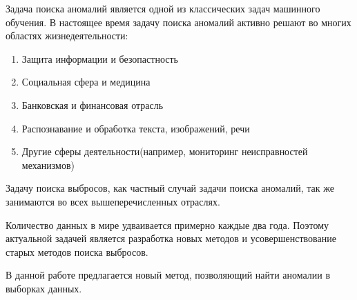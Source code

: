 \Introduction

Задача поиска аномалий является одной из классических задач машинного обучения. В настоящее время задачу поиска аномалий активно решают во многих областях жизнедеятельности:
\begin{enumerate} 
	\item Защита информации и безопастность
	\item Социальная сфера и медицина
	\item Банковская и финансовая отрасль
	\item Распознавание и обработка текста, изображений, речи
	\item Другие сферы деятельности(например, мониторинг неисправностей механизмов)
\end{enumerate}
Задачу поиска выбросов, как частный случай задачи поиска аномалий, так же занимаются во всех вышеперечисленных отраслях. 

Количество данных в мире удваивается примерно каждые два года\cite{def04}. Поэтому актуальной задачей является разработка новых методов и усовершенствование старых методов поиска выбросов.

В данной работе предлагается новый метод, позволяющий найти аномалии в выборках данных.


                                                                                                                                                                                                                                                                                                                    

